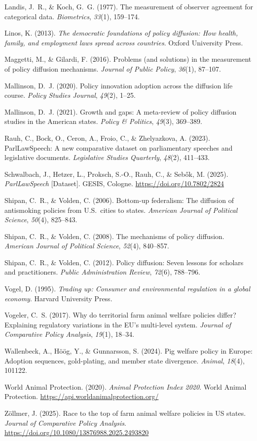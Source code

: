 \documentclass[twocolumn, 10pt, a4paper]{article}
\begin{document}
\noindent Landis, J.~R., \& Koch, G.~G. (1977). The measurement of observer
agreement for categorical data. \textit{Biometrics}, \textit{33}(1), 159--174.

\noindent Linos, K. (2013). \textit{The democratic foundations of policy diffusion:
How health, family, and employment laws spread across countries}. Oxford University
Press.

\noindent Maggetti, M., \& Gilardi, F. (2016). Problems (and solutions) in the
measurement of policy diffusion mechanisms. \textit{Journal of Public Policy},
\textit{36}(1), 87--107.

\noindent Mallinson, D.~J. (2020). Policy innovation adoption across the diffusion
life course. \textit{Policy Studies Journal}, \textit{49}(2), 1--25.

\noindent Mallinson, D.~J. (2021). Growth and gaps: A meta-review of policy
diffusion studies in the American states. \textit{Policy \& Politics},
\textit{49}(3), 369--389.

\noindent Rauh, C., Bock, O., Ceron, A., Froio, C., \& Zhelyazkova, A. (2023).
ParlLawSpeech: A new comparative dataset on parliamentary speeches and legislative
documents. \textit{Legislative Studies Quarterly}, \textit{48}(2), 411--433.

\noindent Schwalbach, J., Hetzer, L., Proksch, S.-O., Rauh, C., \& Seb\H{o}k, M.
(2025). \textit{ParlLawSpeech} [Dataset]. GESIS, Cologne.
\url{https://doi.org/10.7802/2824}

\noindent Shipan, C.~R., \& Volden, C. (2006). Bottom-up federalism: The diffusion
of antismoking policies from U.S.\ cities to states. \textit{American Journal of
Political Science}, \textit{50}(4), 825--843.

\noindent Shipan, C.~R., \& Volden, C. (2008). The mechanisms of policy diffusion.
\textit{American Journal of Political Science}, \textit{52}(4), 840--857.

\noindent Shipan, C.~R., \& Volden, C. (2012). Policy diffusion: Seven lessons for
scholars and practitioners. \textit{Public Administration Review}, \textit{72}(6),
788--796.

\noindent Vogel, D. (1995). \textit{Trading up: Consumer and environmental regulation
in a global economy}. Harvard University Press.

\noindent Vogeler, C.~S. (2017). Why do territorial farm animal welfare policies
differ? Explaining regulatory variations in the EU's multi-level system.
\textit{Journal of Comparative Policy Analysis}, \textit{19}(1), 18--34.

\noindent Wallenbeck, A., H\"{o}\"{o}g, Y., \& Gunnarsson, S. (2024). Pig welfare
policy in Europe: Adoption sequences, gold-plating, and member state divergence.
\textit{Animal}, \textit{18}(4), 101122.

\noindent World Animal Protection. (2020). \textit{Animal Protection Index 2020}.
World Animal Protection. \url{https://api.worldanimalprotection.org/}

\noindent Z\"{o}llmer, J. (2025). Race to the top of farm animal welfare policies in
US states. \textit{Journal of Comparative Policy Analysis}.
\url{https://doi.org/10.1080/13876988.2025.2493820}

\endgroup
\end{document}
